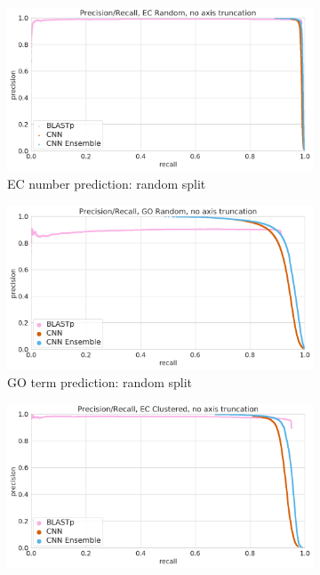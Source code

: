 \begin{figure}[ht] 
  \begin{subfigure}[b]{0.5\linewidth}
    \centering
    \includegraphics[width=0.9\linewidth]{Figures/prc_ec_random_unzoomed.png}
    \caption{EC number prediction: random split} 
    \label{without_ensemble:a} 
    \vspace{4ex}
  \end{subfigure}%
  \begin{subfigure}[b]{0.5\linewidth}
    \centering
    \includegraphics[width=0.9\linewidth]{Figures/prc_go_random_unzoomed.png}
    \caption{GO term prediction: random split} 
    \label{without_ensemble:b} 
    \vspace{4ex}
  \end{subfigure} 
  \begin{subfigure}[b]{0.5\linewidth}
    \centering
    \includegraphics[width=0.9\linewidth]{Figures/prc_ec_clustered_unzoomed.png}

\end{subfigure}
\end{figure}
